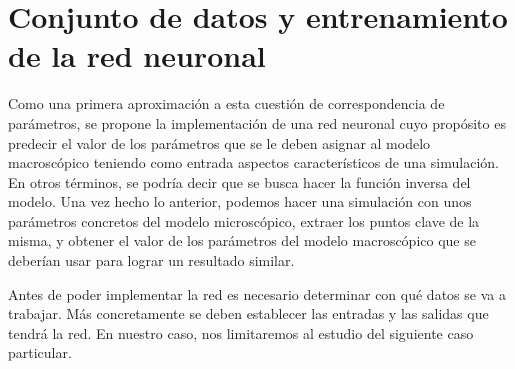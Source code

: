 \section{Conjunto de datos y entrenamiento de la red neuronal}
\label{sec:conjDatos_entreRed}

Como una primera aproximación a esta cuestión de correspondencia de parámetros, se propone la implementación de una red neuronal cuyo propósito es predecir el valor de los parámetros que se le deben asignar al modelo macroscópico teniendo como entrada aspectos característicos de una simulación. En otros términos, se podría decir que se busca hacer la función inversa del modelo. Una vez hecho lo anterior, podemos hacer una simulación con unos parámetros concretos del modelo microscópico, extraer los puntos clave de la misma, y obtener el valor de los parámetros del modelo macroscópico que se deberían usar para lograr un resultado similar. 

Antes de poder implementar la red es necesario determinar con qué datos se va a trabajar. Más concretamente se deben establecer las entradas y las salidas que tendrá la red. En nuestro caso, nos limitaremos al estudio del siguiente caso particular.


